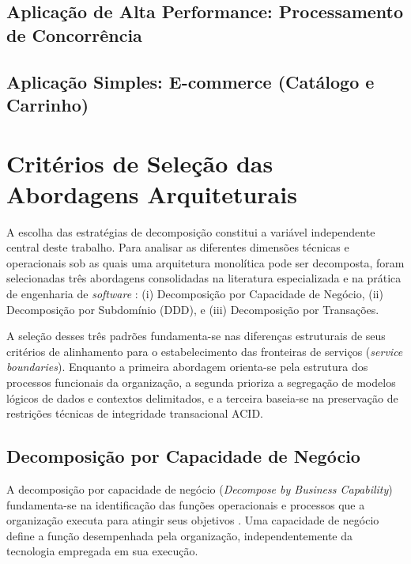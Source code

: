 \subsection{Aplicação de Alta Performance: Processamento de Concorrência}

\subsection{Aplicação Simples: E-commerce (Catálogo e Carrinho)}

\section{Critérios de Seleção das Abordagens Arquiteturais}
\label{sec:criterios_arquitetura}

A escolha das estratégias de decomposição constitui a variável independente central deste trabalho. Para analisar as diferentes dimensões técnicas e operacionais sob as quais uma arquitetura monolítica pode ser decomposta, foram selecionadas três abordagens consolidadas na literatura especializada e na prática de engenharia de \textit{software} \cite{richardson2018, newman2020}: (i) Decomposição por Capacidade de Negócio, (ii) Decomposição por Subdomínio (DDD), e (iii) Decomposição por Transações.

A seleção desses três padrões fundamenta-se nas diferenças estruturais de seus critérios de alinhamento para o estabelecimento das fronteiras de serviços (\textit{service boundaries}). Enquanto a primeira abordagem orienta-se pela estrutura dos processos funcionais da organização, a segunda prioriza a segregação de modelos lógicos de dados e contextos delimitados, e a terceira baseia-se na preservação de restrições técnicas de integridade transacional ACID.

\subsection{Decomposição por Capacidade de Negócio}

A decomposição por capacidade de negócio (\textit{Decompose by Business Capability}) fundamenta-se na identificação das funções operacionais e processos que a organização executa para atingir seus objetivos \cite{richardson2018}. Uma capacidade de negócio define a função desempenhada pela organização, independentemente da tecnologia empregada em sua execução.

